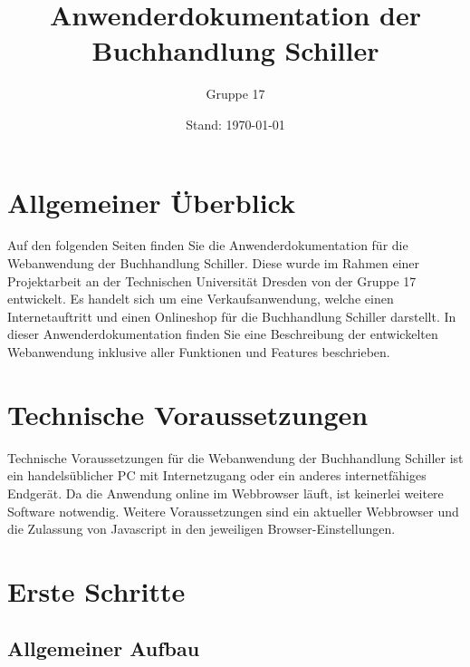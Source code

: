 \documentclass[a4paper]{article}
\author{Gruppe 17}
\date{Stand: \today}
\title{
	\normalfont
	\normalsize 
	\huge{Anwenderdokumentation der Buchhandlung Schiller}
	\horrule{2pt}	
}
\begin{document}
\maketitle

\newpage

\tableofcontents

\newpage


\section{Allgemeiner Überblick}

Auf den folgenden Seiten finden Sie die Anwenderdokumentation für die Webanwendung der Buchhandlung Schiller. Diese wurde im Rahmen einer Projektarbeit an der Technischen Universität Dresden von der Gruppe 17 entwickelt. Es handelt sich um eine Verkaufsanwendung, welche einen Internetauftritt und einen Onlineshop für die Buchhandlung Schiller darstellt. In dieser Anwenderdokumentation finden Sie eine Beschreibung der entwickelten Webanwendung inklusive aller Funktionen und Features beschrieben.


\section{Technische Voraussetzungen}

Technische Voraussetzungen für die Webanwendung der Buchhandlung Schiller ist ein handelsüblicher PC mit Internetzugang oder ein anderes internetfähiges Endgerät. Da die Anwendung online im Webbrowser läuft, ist keinerlei weitere Software notwendig. Weitere Voraussetzungen sind ein aktueller Webbrowser und die Zulassung von Javascript in den jeweiligen Browser-Einstellungen.


\section{Erste Schritte}

\subsection{Allgemeiner Aufbau}
\end{document}
